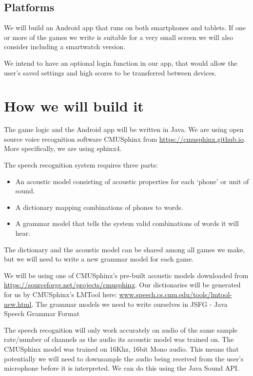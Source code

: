 \documentclass[11pt, oneside]{article}
\begin{document}
\subsection*{Platforms}

We will build an Android app that runs on both smartphones and
tablets. If one or more of the games we write is suitable for a very
small screen we will also consider including a smartwatch version.

We intend to have an optional login function in our app, that would
allow the user's saved settings and high scores to be transferred between
devices.


\section*{How we will build it}

The game logic and the Android app will be written in Java. We are
using open source voice recognition software CMUSphinx from
\url{https://cmusphinx.github.io}. More specifically, we are using sphinx4.

The speech recognition system requires three parts:
\begin{itemize}
\item An acoustic model consisting of acoustic properties for each
  `phone' or unit of sound.
\item A dictionary mapping combinations of phones to words.
\item A grammar model that tells the system valid combinations of
  words it will hear.
\end{itemize}

The dictionary and the acoustic model can be shared among all games we
make, but we will need to write a new grammar model for each game.

We will be using one of CMUSphinx's pre-built acoustic models
downloaded from \url{https://sourceforge.net/projects/cmusphinx}. Our
dictionaries will be generated for us by CMUSphinx's LMTool here:
\url{www.speech.cs.cmu.edu/tools/lmtool-new.html}. The grammar models
we need to write ourselves in JSFG - Java Speech Grammar Format

The speech recognition will only work accurately on audio of the same
sample rate/number of channels as the audio its acoustic model was
trained on. The CMUSphinx model was trained on 16Khz, 16bit Mono
audio. This means that potentially we will need to downsample the
audio being received from the user's microphone before it is
interpreted. We can do this using the Java Sound API.
\end{document}
